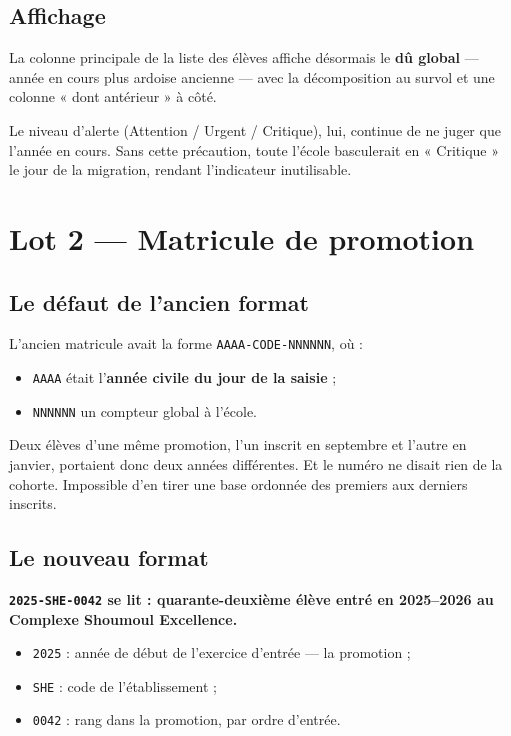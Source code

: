 \documentclass[11pt,a4paper]{report}
\newcommand{\encadre}[2]{%
  \begingroup
  \setlength{\fboxsep}{9pt}%
  \noindent\colorbox{sagibg}{%
    \begin{minipage}{\dimexpr\linewidth-2\fboxsep\relax}
    \textbf{\color{#1}#2}
    \end{minipage}}%
  \par\vspace{8pt}
  \endgroup}
\newcommand{\pointcle}[1]{\encadre{sagiteal}{#1}}
\begin{document}
\section{Affichage}

La colonne principale de la liste des élèves affiche désormais le \textbf{dû
global} --- année en cours plus ardoise ancienne --- avec la décomposition au
survol et une colonne « dont antérieur » à côté.

Le niveau d'alerte (Attention / Urgent / Critique), lui, continue de ne juger
que l'année en cours. Sans cette précaution, toute l'école basculerait en
« Critique » le jour de la migration, rendant l'indicateur inutilisable.

\chapter{Lot 2 --- Matricule de promotion}

\section{Le défaut de l'ancien format}

L'ancien matricule avait la forme \texttt{AAAA-CODE-NNNNNN}, où :

\begin{itemize}
\item \texttt{AAAA} était l'\textbf{année civile du jour de la saisie} ;
\item \texttt{NNNNNN} un compteur global à l'école.
\end{itemize}

Deux élèves d'une même promotion, l'un inscrit en septembre et l'autre en
janvier, portaient donc deux années différentes. Et le numéro ne disait rien de
la cohorte. Impossible d'en tirer une base ordonnée des premiers aux derniers
inscrits.

\section{Le nouveau format}

\pointcle{\texttt{2025-SHE-0042} se lit : quarante-deuxième élève entré en
2025--2026 au Complexe Shoumoul Excellence.}

\begin{itemize}
\item \texttt{2025} : année de début de l'exercice d'entrée --- la promotion ;
\item \texttt{SHE} : code de l'établissement ;
\item \texttt{0042} : rang dans la promotion, par ordre d'entrée.
\end{itemize}
\end{document}
